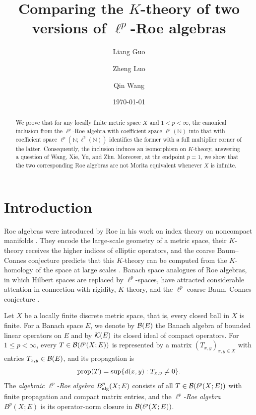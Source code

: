 \documentclass[11pt,reqno]{amsart}
\author[L.~Guo]{Liang Guo}
\author[Z.~Luo]{Zheng Luo}
\author[Q.~Wang]{Qin Wang}
\title[Comparing the $K$-theory of two versions of $\ell^p$-Roe algebras]{Comparing the $K$-theory of two versions of $\ell^p$-Roe algebras}
\date{\today}
\theoremstyle{definition}
\theoremstyle{plain}
\def\prop{\textup{prop}}
\begin{document}
\begin{abstract}
We prove that for any locally finite metric space $X$ and $1<p<\infty$, the canonical inclusion from the $\ell^p$-Roe algebra with coefficient space $\ell^p(\mathbb N)$ into that with coefficient space $\ell^p(\mathbb N;\ell^2(\mathbb N))$ identifies the former with a full multiplier corner of the latter. Consequently, the inclusion induces an isomorphism on $K$-theory, answering a question of Wang, Xie, Yu, and Zhu. Moreover, at the endpoint $p=1$, we show that the two corresponding Roe algebras are not Morita equivalent whenever $X$ is infinite.
\end{abstract}

\maketitle

\section{Introduction}

Roe algebras were introduced by Roe in his work on index theory on noncompact manifolds \cite{Roe93}. They encode the large-scale geometry of a metric space, their $K$-theory receives the higher indices of elliptic operators, and the coarse Baum--Connes conjecture predicts that this $K$-theory can be computed from the $K$-homology of the space at large scales \cite{HR95, Yu00, WY20}. Banach space analogues of Roe algebras, in which Hilbert spaces are replaced by $\ell^p$-spaces, have attracted considerable attention in connection with rigidity, $K$-theory, and the $\ell^p$ coarse Baum--Connes conjecture \cite{CL18, CL21, Zha21, CN23, WXYZ24}.

Let $X$ be a locally finite discrete metric space, that is, every closed ball in $X$ is finite. For a Banach space $E$, we denote by $\mathcal B(E)$ the Banach algebra of bounded linear operators on $E$ and by $\mathcal K(E)$ its closed ideal of compact operators. For $1\le p<\infty$, every $T\in\mathcal B(\ell^p(X;E))$ is represented by a matrix $(T_{x,y})_{x,y\in X}$ with entries $T_{x,y}\in\mathcal B(E)$, and its propagation is
\[
\prop(T)=\sup\{d(x,y):T_{x,y}\ne0\}.
\]
The \emph{algebraic $\ell^p$-Roe algebra} $B^p_{\textup{alg}}(X;E)$ consists of all $T\in\mathcal B(\ell^p(X;E))$ with finite propagation and compact matrix entries, and the \emph{$\ell^p$-Roe algebra} $B^p(X;E)$ is its operator-norm closure in $\mathcal B(\ell^p(X;E))$.
\end{document}
